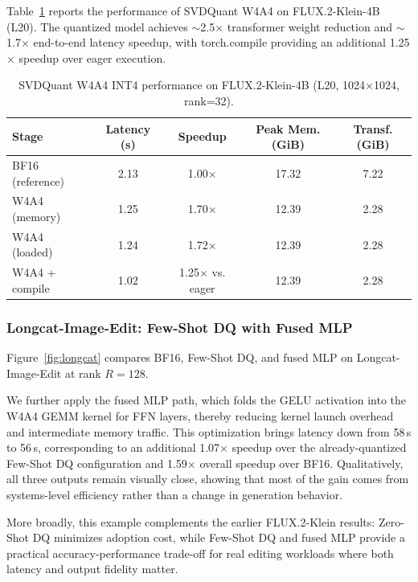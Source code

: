\documentclass[10pt]{article}
\begin{document}
Table~\ref{tab:svdq_perf} reports the performance of SVDQuant W4A4 on FLUX.2-Klein-4B (L20). The quantized model achieves $\sim$2.5$\times$ transformer weight reduction and $\sim$1.7$\times$ end-to-end latency speedup, with torch.compile providing an additional 1.25$\times$ speedup over eager execution.

\begin{table}[htbp]
\centering
\caption{SVDQuant W4A4 INT4 performance on FLUX.2-Klein-4B (L20, 1024$\times$1024, rank=32).}
\label{tab:svdq_perf}
{\small
\begin{tabular}{lcccc}
\toprule
\textbf{Stage} & \textbf{Latency (s)} & \textbf{Speedup} & \textbf{Peak Mem. (GiB)} & \textbf{Transf. (GiB)} \\
\midrule
BF16 (reference) & 2.13 & 1.00$\times$ & 17.32 & 7.22 \\
W4A4 (memory) & 1.25 & 1.70$\times$ & 12.39 & 2.28 \\
W4A4 (loaded) & 1.24 & 1.72$\times$ & 12.39 & 2.28 \\
W4A4 + compile & 1.02 & 1.25$\times$ vs. eager & 12.39 & 2.28 \\
\bottomrule
\end{tabular}
}
\end{table}

\subsubsection{Longcat-Image-Edit: Few-Shot DQ with Fused MLP}

Figure~\ref{fig:longcat} compares BF16, Few-Shot DQ, and fused MLP on Longcat-Image-Edit at rank $R=128$.

We further apply the fused MLP path, which folds the GELU activation into the W4A4 GEMM kernel for FFN layers, thereby reducing kernel launch overhead and intermediate memory traffic. This optimization brings latency down from 58\,s to 56\,s, corresponding to an additional 1.07$\times$ speedup over the already-quantized Few-Shot DQ configuration and 1.59$\times$ overall speedup over BF16. Qualitatively, all three outputs remain visually close, showing that most of the gain comes from systems-level efficiency rather than a change in generation behavior.

More broadly, this example complements the earlier FLUX.2-Klein results: Zero-Shot DQ minimizes adoption cost, while Few-Shot DQ and fused MLP provide a practical accuracy-performance trade-off for real editing workloads where both latency and output fidelity matter.
\end{document}
